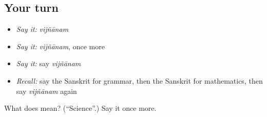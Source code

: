 \subsection*{Your turn}
\begin{itemize}
\raggedright
  \item \emph{Say it:} \emph{vijñānam}
  \item \emph{Say it:} \emph{vijñānam}, once more
  \item \emph{Say it:} say \emph{vijñānam}
  \item \emph{Recall:} say the Sanskrit for grammar, then the Sanskrit for mathematics, then say \emph{vijñānam} again
\end{itemize}

\begin{tcolorbox}[breakable,colback=teal!4,colframe=teal!35!black,title={Before you move on}]
What does  mean? (\textquotedblleft{}Science\textquotedblright{}.) Say it once more.
\end{tcolorbox}
